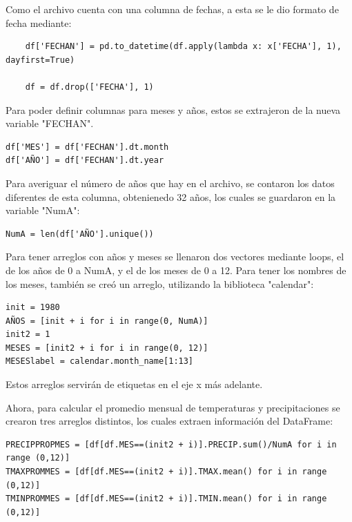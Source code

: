 \documentclass[letterpaper,12pt]{article}
\begin{document}
Como el archivo cuenta con una columna de fechas, a esta se le dio formato de fecha mediante:
\begin{verbatim}
    df['FECHAN'] = pd.to_datetime(df.apply(lambda x: x['FECHA'], 1), dayfirst=True)
    
    df = df.drop(['FECHA'], 1)
\end{verbatim}

Para poder definir columnas para meses y años, estos se extrajeron de la nueva variable "FECHAN".

\begin{verbatim}
df['MES'] = df['FECHAN'].dt.month
df['AÑO'] = df['FECHAN'].dt.year
\end{verbatim} 

Para averiguar el número de años que hay en el archivo, se contaron los datos diferentes de esta columna, obtenienedo 32 años, los cuales se guardaron en la variable "NumA":
\begin{verbatim}
NumA = len(df['AÑO'].unique())
\end{verbatim} 

Para tener arreglos con años y meses se llenaron dos vectores mediante loops, el de los años de 0 a NumA, y el de los meses de 0 a 12. Para tener los nombres de los meses, también se creó un arreglo, utilizando la biblioteca "calendar":
\begin{verbatim}
init = 1980
AÑOS = [init + i for i in range(0, NumA)]
init2 = 1
MESES = [init2 + i for i in range(0, 12)]
MESESlabel = calendar.month_name[1:13]
\end{verbatim} 

Estos arreglos servirán de etiquetas en el eje x más adelante.

Ahora, para calcular el promedio mensual de temperaturas y precipitaciones se crearon tres arreglos distintos, los cuales extraen información del DataFrame:
\begin{verbatim}
PRECIPPROPMES = [df[df.MES==(init2 + i)].PRECIP.sum()/NumA for i in range (0,12)]
TMAXPROMMES = [df[df.MES==(init2 + i)].TMAX.mean() for i in range (0,12)]
TMINPROMMES = [df[df.MES==(init2 + i)].TMIN.mean() for i in range (0,12)]
\end{verbatim} 
\end{document}
